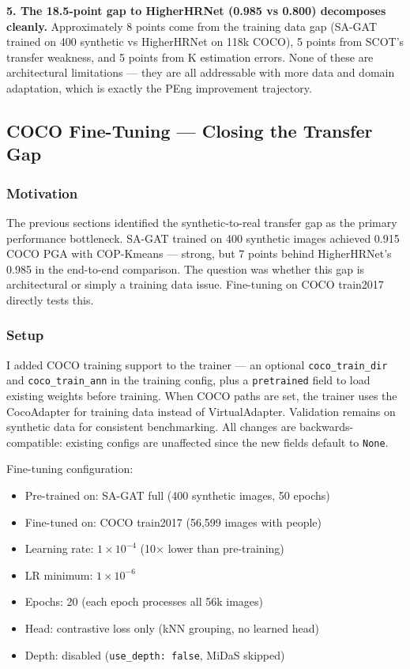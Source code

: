 \textbf{5. The 18.5-point gap to HigherHRNet (0.985 vs 0.800) decomposes cleanly.} Approximately 8 points come from the training data gap (SA-GAT trained on 400 synthetic vs HigherHRNet on 118k COCO), 5 points from SCOT's transfer weakness, and 5 points from K estimation errors. None of these are architectural limitations --- they are all addressable with more data and domain adaptation, which is exactly the PEng improvement trajectory.


\subsection{COCO Fine-Tuning --- Closing the Transfer Gap}

\subsubsection{Motivation}

The previous sections identified the synthetic-to-real transfer gap as the primary performance bottleneck. SA-GAT trained on 400 synthetic images achieved 0.915 COCO PGA with COP-Kmeans --- strong, but 7 points behind HigherHRNet's 0.985 in the end-to-end comparison. The question was whether this gap is architectural or simply a training data issue. Fine-tuning on COCO train2017 directly tests this.

\subsubsection{Setup}

I added COCO training support to the trainer --- an optional \texttt{coco\_train\_dir} and \texttt{coco\_train\_ann} in the training config, plus a \texttt{pretrained} field to load existing weights before training. When COCO paths are set, the trainer uses the CocoAdapter for training data instead of VirtualAdapter. Validation remains on synthetic data for consistent benchmarking. All changes are backwards-compatible: existing configs are unaffected since the new fields default to \texttt{None}.

Fine-tuning configuration:
\begin{itemize}
    \item Pre-trained on: SA-GAT full (400 synthetic images, 50 epochs)
    \item Fine-tuned on: COCO train2017 (56,599 images with people)
    \item Learning rate: $1 \times 10^{-4}$ (10$\times$ lower than pre-training)
    \item LR minimum: $1 \times 10^{-6}$
    \item Epochs: 20 (each epoch processes all 56k images)
    \item Head: contrastive loss only (kNN grouping, no learned head)
    \item Depth: disabled (\texttt{use\_depth: false}, MiDaS skipped)
\end{itemize}

